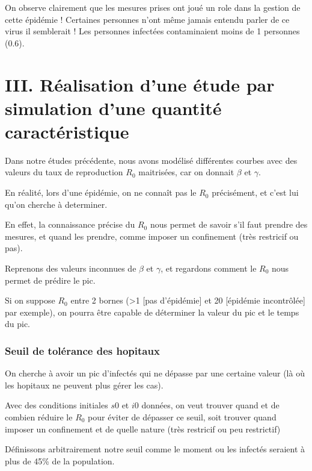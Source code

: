 \documentclass[
]{article}
\begin{document}
On observe clairement que les mesures prises ont joué un role dans la
gestion de cette épidémie ! Certaines personnes n'ont même jamais
entendu parler de ce virus il semblerait ! Les personnes infectées
contaminaient moins de 1 personnes (0.6).

\hypertarget{iii.-ruxe9alisation-dune-uxe9tude-par-simulation-dune-quantituxe9-caractuxe9ristique}{%
\section{III. Réalisation d'une étude par simulation d'une quantité
caractéristique}\label{iii.-ruxe9alisation-dune-uxe9tude-par-simulation-dune-quantituxe9-caractuxe9ristique}}

Dans notre études précédente, nous avons modélisé différentes courbes
avec des valeurs du taux de reproduction \(R_0\) maitrisées, car on
donnait \(\beta\) et \(\gamma\).

En réalité, lors d'une épidémie, on ne connaît pas le \(R_0\)
précisément, et c'est lui qu'on cherche à determiner.

En effet, la connaissance précise du \(R_0\) nous permet de savoir s'il
faut prendre des mesures, et quand les prendre, comme imposer un
confinement (très restricif ou pas).

Reprenons des valeurs inconnues de \(\beta\) et \(\gamma\), et regardons
comment le \(R_0\) nous permet de prédire le pic.

Si on suppose \(R_0\) entre 2 bornes (\textgreater1 {[}pas d'épidémie{]}
et 20 {[}épidémie incontrôlée{]} par exemple), on pourra être capable de
déterminer la valeur du pic et le temps du pic.

\hypertarget{seuil-de-toluxe9rance-des-hopitaux}{%
\subsubsection{Seuil de tolérance des
hopitaux}\label{seuil-de-toluxe9rance-des-hopitaux}}

On cherche à avoir un pic d'infectés qui ne dépasse par une certaine
valeur (là où les hopitaux ne peuvent plus gérer les cas).

Avec des conditions initiales \(s0\) et \(i0\) données, on veut trouver
quand et de combien réduire le \(R_0\) pour éviter de dépasser ce seuil,
soit trouver quand imposer un confinement et de quelle nature (très
restricif ou peu restrictif)

Définissons arbitrairement notre seuil comme le moment ou les infectés
seraient à plus de 45\% de la population.
\end{document}
